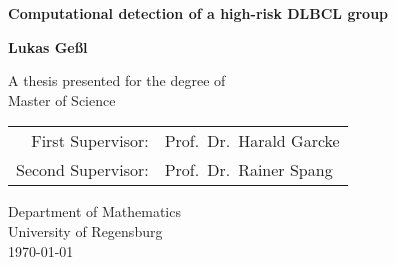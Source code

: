 \documentclass[10.5pt, a4paper, oneside]{report}
\begin{document}
    \begin{titlepage}
        \centering
        \vspace*{1cm}
        
        \huge
        \textsf{
        \textbf{Computational detection of a high-risk DLBCL group}
        }
        
        \vspace{1.5cm}
        
        \large
        \textbf{Lukas Geßl}
        
        \vfill
        
        \large
        A thesis presented for the degree of\\
        Master of Science
        
        \vspace{0.8cm}
        
        \begin{tabular}{rl}
            First Supervisor: & Prof.\ Dr.\ Harald Garcke \\
            Second Supervisor: & Prof.\ Dr.\ Rainer Spang \\
        \end{tabular}
        
        \vspace{0.8cm}
        
        Department of Mathematics\\
        University of Regensburg\\
        \vspace{0.8cm}
        \today
        
    \end{titlepage}
\end{document}
